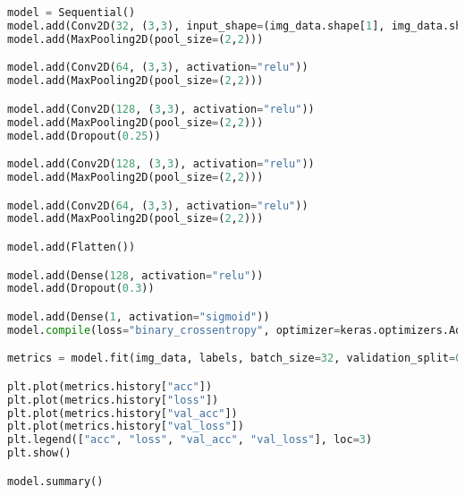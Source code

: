\section{}
\label{sec:appa}
\begin{lstlisting}[language=Python, caption=CNN for galaxy classification with TensorFlow]
model = Sequential()
model.add(Conv2D(32, (3,3), input_shape=(img_data.shape[1], img_data.shape[2], img_data.shape[3]), activation="relu"))
model.add(MaxPooling2D(pool_size=(2,2)))

model.add(Conv2D(64, (3,3), activation="relu"))
model.add(MaxPooling2D(pool_size=(2,2)))

model.add(Conv2D(128, (3,3), activation="relu"))
model.add(MaxPooling2D(pool_size=(2,2)))
model.add(Dropout(0.25))

model.add(Conv2D(128, (3,3), activation="relu"))
model.add(MaxPooling2D(pool_size=(2,2)))

model.add(Conv2D(64, (3,3), activation="relu"))
model.add(MaxPooling2D(pool_size=(2,2)))

model.add(Flatten())

model.add(Dense(128, activation="relu"))
model.add(Dropout(0.3))

model.add(Dense(1, activation="sigmoid"))
model.compile(loss="binary_crossentropy", optimizer=keras.optimizers.Adam(lr=0.0001), metrics=["accuracy"])

metrics = model.fit(img_data, labels, batch_size=32, validation_split=0.3, epochs=30)

plt.plot(metrics.history["acc"])
plt.plot(metrics.history["loss"])
plt.plot(metrics.history["val_acc"])
plt.plot(metrics.history["val_loss"])
plt.legend(["acc", "loss", "val_acc", "val_loss"], loc=3)
plt.show()

model.summary()
\end{lstlisting}


